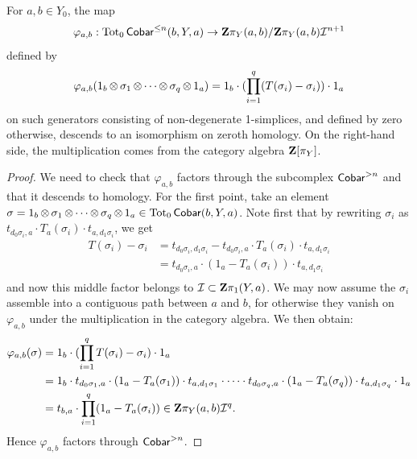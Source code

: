 \begin{prop}\label{prop:phi_a_b}
    For $a,b \in Y_0$, the map 
    \[\varphi_{a,b}: \operatorname{Tot}_0\operatorname{\mathsf{Cobar}}^{\leq n}(b, Y ,a) \to \mathbf{Z}\pi_Y(a,b)/\mathbf{Z}\pi_Y(a,b)\mathcal{I}^{n+1}\]
    defined by
    \[\varphi_{a,b}(1_b \operatorname{\otimes} \sigma_1 \operatorname{\otimes} \cdots\operatorname{\otimes} \sigma_q \operatorname{\otimes} 1_a) = 1_b\cdot (\prod_{i=1}^q(T(\sigma_i)-\sigma_i))\cdot 1_a\]
    on such generators consisting of non-degenerate 1-simplices, and defined by zero otherwise, descends to an isomorphism on zeroth homology. On the right-hand side, the multiplication comes from the category algebra $\mathbf{Z}[\pi_Y]$.
    \begin{proof}
        We need to check that $\varphi_{a,b}$ factors through the subcomplex $\operatorname{\mathsf{Cobar}}^{> n}$ and that it descends to homology. For the first point, take an element $\sigma= 1_b \operatorname{\otimes} \sigma_1 \operatorname{\otimes} \cdots\operatorname{\otimes} \sigma_q \operatorname{\otimes} 1_a \in \operatorname{Tot}_0\operatorname{\mathsf{Cobar}}(b,Y,a)$. Note first that by rewriting $\sigma_i$ as $t_{d_0\sigma_i, a} \cdot T_a(\sigma_i) \cdot t_{a, d_1\sigma_i}$, we get 
        \begin{equation*}
        \begin{split}
        T(\sigma_i)-\sigma_i &= t_{d_0\sigma_i, d_1\sigma_i} - t_{d_0\sigma_i, a} \cdot T_a(\sigma_i) \cdot t_{a, d_1\sigma_i} \\
        &= t_{d_0\sigma_i, a}\cdot (1_a - T_a(\sigma_i))\cdot t_{a, d_1\sigma_i} \\
        \end{split}
        \end{equation*}
        and now this middle factor belongs to $\mathcal{I} \subset \mathbf{Z}\pi_1(Y,a)$. We may now assume the $\sigma_i$ assemble into a contiguous path between $a$ and $b$, for otherwise they vanish on $\varphi_{a,b}$ under the multiplication in the category algebra. We then obtain:
        \begin{equation*}
        \begin{split}
        \varphi_{a,b}(\sigma) &= 1_b\cdot (\prod_{i=1}^q T(\sigma_i) - \sigma_i)\cdot 1_a \\
        &= 1_b \cdot t_{d_0\sigma_1, a}\cdot (1_a - T_a(\sigma_1))\cdot t_{a, d_1\sigma_1} \cdot \cdots \cdot t_{d_0\sigma_q, a}\cdot (1_a - T_a(\sigma_q))\cdot t_{a, d_1\sigma_q}\cdot 1_a \\
        &= t_{b,a} \cdot \prod_{i=1}^q(1_a - T_a(\sigma_i)) \in \mathbf{Z}\pi_Y(a,b)\mathcal{I}^q.
        \end{split}
        \end{equation*}
        Hence $\varphi_{a,b}$ factors through $\operatorname{\mathsf{Cobar}}^{> n}$. 
        

\end{proof}
\end{prop}
